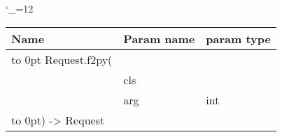 \begingroup \catcode`\_=12 \tt
\begin{tabular}{lll}
\toprule
\textrm{Name}&\textrm{Param name}&\textrm{param type}\\
\midrule
\hbox to 0pt {Request.f2py(\hss}\\
& cls\\
& arg & int\\
\hbox to 0pt{) -> Request\hss}\\
\bottomrule
\end{tabular}
\endgroup
